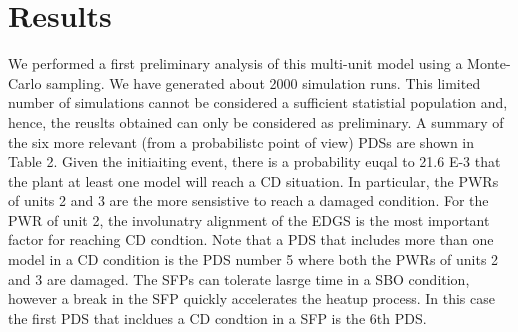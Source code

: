 \section{Results}
\label{sec:results}

We performed a first preliminary analysis of this multi-unit model using a Monte-Carlo sampling. 
We have generated about 2000 simulation runs.  This limited number of simulations cannot be considered 
a sufficient statistial population and, hence, the reuslts obtained can only be considered as preliminary.
A summary of the six more relevant (from a probabilistc point of view) PDSs are shown in Table 2. 
Given the initiaiting event, there is a probability euqal to 21.6 E-3 that the plant at least one model 
will reach a CD situation. In particular, the PWRs of units 2 and 3 are the more sensistive to reach a 
damaged condition. For the PWR of unit 2, the involunatry alignment of the EDGS is the most important 
factor for reaching CD condtion.
Note that a PDS that includes more than one model in a CD condition is the PDS number 5 where both the 
PWRs of units 2 and 3 are damaged.
The SFPs can tolerate lasrge time in a SBO condition, however a break in the SFP quickly accelerates 
the heatup process. In this case the first PDS that incldues a CD condtion in a SFP is the 6th PDS.
